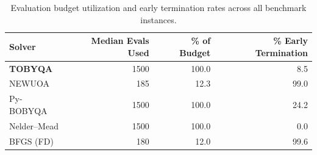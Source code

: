 \begin{table}[t]\centering\small
\caption{Evaluation budget utilization and early termination rates across all benchmark instances.}
\label{tab:budget}
\begin{tabular}{lrrr}\toprule
Solver & Median Evals Used & \% of Budget & \% Early Termination \\\midrule
\textbf{TOBYQA} & 1500 & 100.0 & 8.5 \\
NEWUOA & 185 & 12.3 & 99.0 \\
Py-BOBYQA & 1500 & 100.0 & 24.2 \\
Nelder--Mead & 1500 & 100.0 & 0.0 \\
BFGS (FD) & 180 & 12.0 & 99.6 \\
\bottomrule\end{tabular}\end{table}